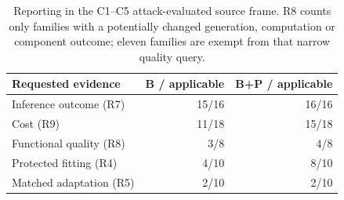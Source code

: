 \begin{table}[t]\centering\footnotesize
\caption{Reporting in the C1--C5 attack-evaluated source frame. R8 counts only families with a potentially changed generation, computation or component outcome; eleven families are exempt from that narrow quality query.}\label{tab:r35-reporting}
\begin{tabularx}{\columnwidth}{@{}Yrr@{}}\toprule
Requested evidence & B / applicable & B+P / applicable\\\midrule
Inference outcome (R7) & 15/16 & 16/16\\
Cost (R9) & 11/18 & 15/18\\
Functional quality (R8) & 3/8 & 4/8\\
Protected fitting (R4) & 4/10 & 8/10\\
Matched adaptation (R5) & 2/10 & 2/10\\
\bottomrule\end{tabularx}\end{table}
